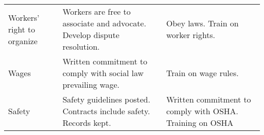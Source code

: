 \begin{table}
\begin{longtable}[]{@{}lll@{}}
\begin{minipage}[t]{0.20\columnwidth}\raggedright\strut
Workers' right to organize\strut
\end{minipage} & \begin{minipage}[t]{0.36\columnwidth}\raggedright\strut
Workers are free to associate and advocate. Develop dispute
resolution.\strut
\end{minipage} & \begin{minipage}[t]{0.36\columnwidth}\raggedright\strut
Obey laws. Train on worker rights.\strut
\end{minipage}\tabularnewline
\begin{minipage}[t]{0.20\columnwidth}\raggedright\strut
Wages\strut
\end{minipage} & \begin{minipage}[t]{0.36\columnwidth}\raggedright\strut
Written commitment to comply with social law prevailing wage.\strut
\end{minipage} & \begin{minipage}[t]{0.36\columnwidth}\raggedright\strut
Train on wage rules.\strut
\end{minipage}\tabularnewline
\begin{minipage}[t]{0.20\columnwidth}\raggedright\strut
Safety\strut
\end{minipage} & \begin{minipage}[t]{0.36\columnwidth}\raggedright\strut
Safety guidelines posted. Contracts include safety. Records kept.\strut
\end{minipage} & \begin{minipage}[t]{0.36\columnwidth}\raggedright\strut
Written commitment to comply with OSHA. Training on OSHA\strut
\end{minipage}\tabularnewline
\bottomrule
\end{longtable}

\end{table}
